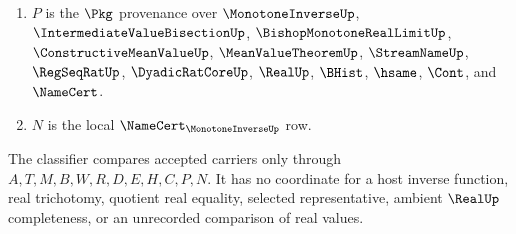 \begin{definition}
\begin{enumerate}
\item $P$ is the $\Pkg$ provenance over $\MonotoneInverseUp$, $\IntermediateValueBisectionUp$, $\BishopMonotoneRealLimitUp$, $\ConstructiveMeanValueUp$, $\MeanValueTheoremUp$, $\StreamNameUp$, $\RegSeqRatUp$, $\DyadicRatCoreUp$, $\RealUp$, $\BHist$, $\hsame$, $\Cont$, and $\NameCert$.
\item $N$ is the local $\NameCert_{\MonotoneInverseUp}$ row.
\end{enumerate}
The classifier compares accepted carriers only through $A,T,M,B,W,R,D,E,H,C,P,N$. It has no coordinate for a host inverse function, real trichotomy, quotient real equality, selected representative, ambient $\RealUp$ completeness, or an unrecorded comparison of real values.
\end{definition}

